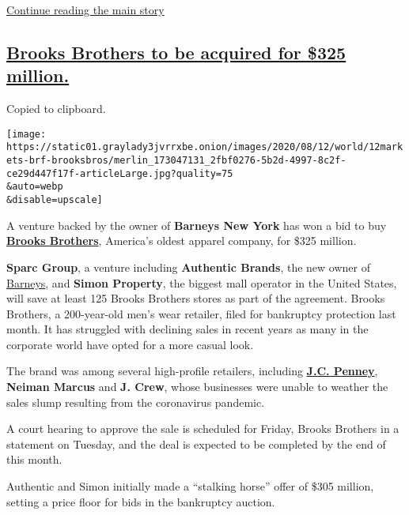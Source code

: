 \protect\hyperlink{after-dfp-ad-mid3}{Continue reading the main story}

\hypertarget{brooks-brothers-to-be-acquired-for-325-million}{%
\subsection{\texorpdfstring{\protect\hyperlink{brooks-brothers-to-be-acquired-for-325-million}{Brooks
Brothers to be acquired for \$325
million.}}{Brooks Brothers to be acquired for \$325 million.}}\label{brooks-brothers-to-be-acquired-for-325-million}}

Copied to clipboard.

\texttt{[image: https://static01.graylady3jvrrxbe.onion/images/2020/08/12/world/12markets-brf-brooksbros/merlin\_173047131\_2fbf0276-5b2d-4997-8c2f-ce29d447f17f-articleLarge.jpg?quality=75\\\&auto=webp\\\&disable=upscale]}

A venture backed by the owner of \textbf{Barneys New York} has won a bid
to buy
\textbf{\href{https://www.nytimes3xbfgragh.onion/2020/07/08/business/brooks-brothers-chapter-11-bankruptcy.html}{Brooks
Brothers}}, America's oldest apparel company, for \$325 million.

\textbf{Sparc Group}, a venture including \textbf{Authentic Brands}, the
new owner of
\href{https://www.nytimes3xbfgragh.onion/2019/11/01/business/barneys-bankruptcy-authentic-brands.html}{Barneys},
and \textbf{Simon Property}, the biggest mall operator in the United
States, will save at least 125 Brooks Brothers stores as part of the
agreement. Brooks Brothers, a 200-year-old men's wear retailer, filed
for bankruptcy protection last month. It has struggled with declining
sales in recent years as many in the corporate world have opted for a
more casual look.

The brand was among several high-profile retailers, including
\textbf{\href{https://www.nytimes3xbfgragh.onion/2020/05/15/business/jc-penney-bankruptcy-coronavirus.html}{J.C.
Penney}}, \textbf{Neiman Marcus} and \textbf{J. Crew}, whose businesses
were unable to weather the sales slump resulting from the coronavirus
pandemic.

A court hearing to approve the sale is scheduled for Friday, Brooks
Brothers in a statement on Tuesday, and the deal is expected to be
completed by the end of this month.

Authentic and Simon initially made a ``stalking horse'' offer of \$305
million, setting a price floor for bids in the bankruptcy auction.

